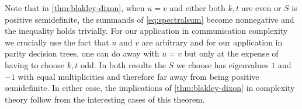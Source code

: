 \begin{remark}
Note that in \autoref{thm:blakley-dixon}, when $u=v$ and either
both $k,t$ are even or $S$ is positive semidefinite, the
summands of \autoref{eq:spectralsum} become nonnegative and the
inequality holds trivially. For our application in communication
complexity we crucially use the fact that $u$ and $v$ are
arbitrary and for our application in parity decision trees, one
can do away with $u=v$ but only at the expense of having to
choose $k,t$ odd. 
In both results the $S$ we choose has eigenvalues $1$ and $-1$ 
with equal multiplicities and therefore far away from being positive 
semidefinite. In either case, the implications of
\autoref{thm:blakley-dixon} in complexity theory follow 
from the interesting cases of this theorem.
\end{remark}

